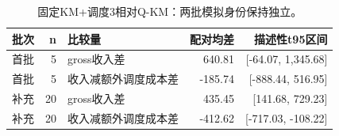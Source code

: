 \begin{table}[htbp]\centering\small
\caption{固定KM+调度3相对Q-KM：两批模拟身份保持独立。}\label{tab:rlmc}
\begin{tabularx}{\linewidth}{lrYrr}\toprule
批次 & n & 比较量 & 配对均差 & 描述性t95区间\\\midrule
首批 & 5 & gross收入差 & 640.81 & [-64.07, 1,345.68]\\
首批 & 5 & 收入减额外调度成本差 & -185.74 & [-888.44, 516.95]\\
补充 & 20 & gross收入差 & 435.45 & [141.68, 729.23]\\
补充 & 20 & 收入减额外调度成本差 & -412.62 & [-717.03, -108.22]\\
\bottomrule\end{tabularx}
\end{table}
